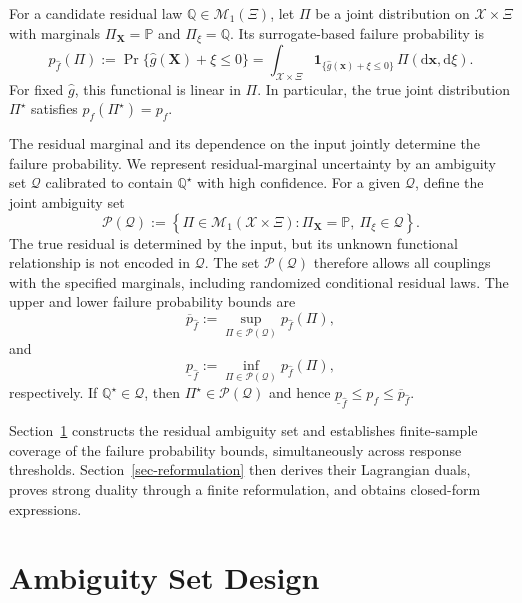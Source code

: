 \documentclass[review,11pt,3p,authoryear,nopreprintline]{elsarticle}
\begin{document}
For a candidate residual law $\mathbb Q\in\mathcal M_1(\Xi)$, let $\Pi$ be a joint distribution on $\mathcal X\times\Xi$ with marginals $\Pi_{\bm X}=\mathbb P$ and $\Pi_\xi=\mathbb Q$. Its surrogate-based failure probability is
\begin{equation}
  p_{\hat f}(\Pi):=\Pr\{\hat g(\bm X)+\xi\le0\}=\int_{\mathcal X\times\Xi}\mathbf 1_{\{\hat g(\bm x)+\xi\le0\}}\,\Pi(\mathrm d\bm x,\mathrm d\xi).
  \label{eq-surrogate-failure-probability}
\end{equation}
For fixed $\hat g$, this functional is linear in $\Pi$. In particular, the true joint distribution $\Pi^\star$ satisfies $p_{\hat f}(\Pi^\star)=p_f$.

The residual marginal and its dependence on the input jointly determine the failure probability. We represent residual-marginal uncertainty by an ambiguity set $\mathcal Q$ calibrated to contain $\mathbb Q^\star$ with high confidence. For a given $\mathcal Q$, define the joint ambiguity set
\[
  \mathcal P(\mathcal Q) :=\left\{\Pi\in\mathcal M_1(\mathcal X\times\Xi):\Pi_{\bm X}=\mathbb P,\ \Pi_\xi\in\mathcal Q\right\}.
\]
The true residual is determined by the input, but its unknown functional relationship is not encoded in $\mathcal Q$. The set $\mathcal P(\mathcal Q)$ therefore allows all couplings with the specified marginals, including randomized conditional residual laws. The upper and lower failure probability bounds are
\begin{equation}
  \overline p_{\hat f}:=\sup_{\Pi\in\mathcal P(\mathcal Q)}p_{\hat f}(\Pi),
  \label{eq-upper-bound}
\end{equation}
and
\begin{equation}
  \underline p_{\hat f}:=\inf_{\Pi\in\mathcal P(\mathcal Q)}p_{\hat f}(\Pi),
  \label{eq-lower-bound}
\end{equation}
respectively. If $\mathbb Q^\star\in\mathcal Q$, then $\Pi^\star\in\mathcal P(\mathcal Q)$ and hence $\underline p_{\hat f}\le p_f\le\overline p_{\hat f}$.


Section~\ref{sec-ambiguity-set} constructs the residual ambiguity set and establishes finite-sample coverage of the failure probability bounds, simultaneously across response thresholds. Section~\ref{sec-reformulation} then derives their Lagrangian duals, proves strong duality through a finite reformulation, and obtains closed-form expressions.


\section{Ambiguity Set Design}
\label{sec-ambiguity-set}
\end{document}
